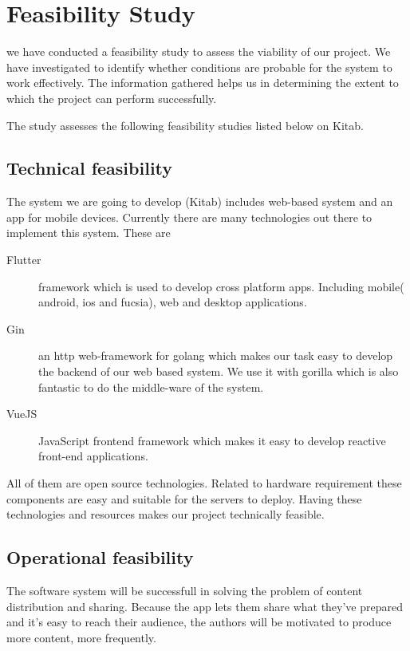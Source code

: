 \section{Feasibility Study}
we have conducted a feasibility study to assess the viability of our project. We have investigated to identify whether conditions are probable for the system to work effectively. The information gathered helps us in determining the extent to which the project can perform successfully.

\bigskip

The study assesses the following feasibility studies listed below on Kitab.

	\subsection{Technical feasibility}
The system we are going to develop (Kitab) includes web-based system and an app for mobile devices. Currently there are many technologies out there to implement this system.
These are

	\begin{description}
	\item[Flutter] framework which is used to develop cross platform apps. Including mobile( android, ios and fucsia), web and desktop applications.
	\item[Gin] an http web-framework for golang which makes our task easy to develop the backend of our web based system. We use it with gorilla which is also fantastic to do the middle-ware of the system.
	\item[VueJS] JavaScript frontend framework which makes it easy to develop reactive front-end applications.
	\end{description}

All of them are open source technologies. Related to hardware requirement these components are easy and suitable for the servers to deploy. Having these technologies and resources makes our project technically feasible.

	\subsection{Operational feasibility}
The software system will be successfull in solving the problem of content distribution and sharing. Because the app lets them share what they've prepared and it's easy to reach their audience, the authors will be motivated to produce more content, more frequently. 

